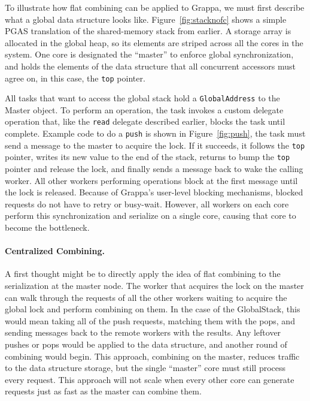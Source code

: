 To illustrate how flat combining can be applied to Grappa, we must first describe what a global data structure looks like. Figure~\ref{fig:stacknofc} shows a simple PGAS translation of the shared-memory stack from earlier. A storage array is allocated in the global heap, so its elements are striped across all the cores in the system. One core is designated the ``master'' to enforce global synchronization, and holds the elements of the data structure that all concurrent accessors must agree on, in this case, the \texttt{top} pointer.

All tasks that want to access the global stack hold a \texttt{GlobalAddress} to the Master object. To perform an operation, the task invokes a custom delegate operation that, like the \texttt{read} delegate described earlier, blocks the task until complete. Example code to do a \texttt{push} is shown in Figure~\ref{fig:push}, the task must send a message to the master to acquire the lock. If it succeeds, it follows the \texttt{top} pointer, writes its new value to the end of the stack, returns to bump the \texttt{top} pointer and release the lock, and finally sends a message back to wake the calling worker. All other workers performing operations block at the first message until the lock is released. Because of Grappa's user-level blocking mechanisms, blocked requests do not have to retry or busy-wait. However, all workers on each core perform this synchronization and serialize on a single core, causing that core to become the bottleneck.

\paragraph{Centralized Combining.}
A first thought might be to directly apply the idea of flat combining to the serialization at the master node. The worker that acquires the lock on the master can walk through the requests of all the other workers waiting to acquire the global lock and perform combining on them. In the case of the GlobalStack, this would mean taking all of the push requests, matching them with the pops, and sending messages back to the remote workers with the results. Any leftover pushes or pops would be applied to the data structure, and another round of combining would begin. This approach, combining on the master, reduces traffic to the data structure storage, but the single ``master'' core must still process every request. This approach will not scale when every other core can generate requests just as fast as the master can combine them.

